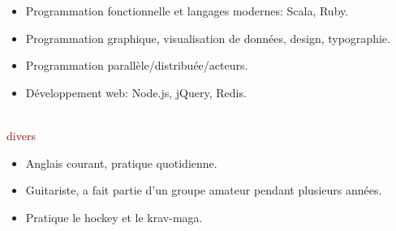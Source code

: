 \documentclass[a4paper, 10pt]{article}
\newcommand{\mysection}[1]{\fontspec{Hoefler Text}\fontsize{24pt}{0pt}\selectfont #1}%
\newcommand{\overlay}[1]{\fontspec[Alternate=1, Ligatures={Common, Rare}]{Hoefler Text}\fontsize{160pt}{0pt}\selectfont #1}%
\begin{document}
\begin{minipage}[t]{0.38\linewidth}
    \begin{itemize}[leftmargin=10.5pt, rightmargin=0pt, labelsep=5pt, itemsep=0pt, topsep=0pt]
      \item Programmation fonctionnelle et langages modernes: Scala, Ruby.
      \item Programmation graphique, visualisation de donn\'ees, design, typographie.
      \item Programmation parall\`ele/distribu\'ee/acteurs.
      \item D\'eveloppement web: Node.js, jQuery, Redis.
    \end{itemize}

	~\\[4pt]
    {\textcolor{maroon}{\mysection divers}}\\[-5pt]

    \begin{itemize}[leftmargin=10.5pt, rightmargin=0pt, labelsep=5pt, itemsep=0pt, topsep=0pt]
      \item Anglais courant, pratique quotidienne.
      \item Guitariste, a fait partie d'un groupe amateur pendant plusieurs ann\'ees.
      \item Pratique le hockey et le krav-maga.
    \end{itemize}
  \end{minipage}
  
\end{document}
